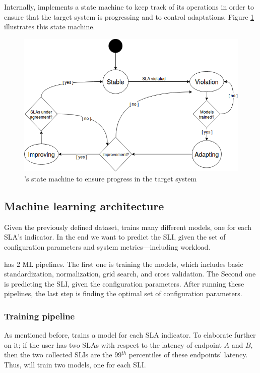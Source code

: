 Internally, \projectname{} implements a state machine to keep track of its operations in order to ensure that the target system is progressing and to control adaptations. Figure \ref{fig:statemachine} illustrates this state machine.

\begin{figure}[ht]
  \includegraphics[width=\columnwidth]{images/FinchStateMachine2.png}
  \caption{\projectname{}'s state machine to ensure progress in the target system}
  \label{fig:statemachine}
\end{figure}

\subsection{Machine learning architecture}

Given the previously defined dataset, \projectname{} trains many different models, one for each SLA's indicator. In the end we want to predict the SLI, given the set of configuration parameters and system metrics---including workload. 

\projectname{} has 2 ML pipelines. The first one is training the models, which includes basic standardization, normalization, grid search, and cross validation. The Second one is predicting the SLI, given the configuration parameters. After running these pipelines, the last step is finding the optimal set of configuration parameters.

\subsubsection{Training pipeline}

As mentioned before, \projectname{} trains a model for each SLA indicator. To elaborate further on it;  if the user has two SLAs with respect to the latency of endpoint $A$ and $B$, then the two collected SLIs are the 99$^{th}$ percentiles of these endpoints' latency. Thus, \projectname{} will train two models, one for each SLI.

